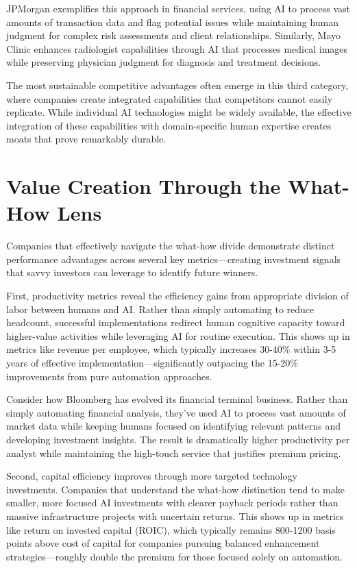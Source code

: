 \documentclass[
  Letterpaper,
]{scrbook}
\begin{document}
JPMorgan exemplifies this approach in financial services, using AI to
process vast amounts of transaction data and flag potential issues while
maintaining human judgment for complex risk assessments and client
relationships. Similarly, Mayo Clinic enhances radiologist capabilities
through AI that processes medical images while preserving physician
judgment for diagnosis and treatment decisions.

The most sustainable competitive advantages often emerge in this third
category, where companies create integrated capabilities that
competitors cannot easily replicate. While individual AI technologies
might be widely available, the effective integration of these
capabilities with domain-specific human expertise creates moats that
prove remarkably durable.

\section{Value Creation Through the What-How
Lens}\label{value-creation-through-the-what-how-lens}

Companies that effectively navigate the what-how divide demonstrate
distinct performance advantages across several key metrics---creating
investment signals that savvy investors can leverage to identify future
winners.

First, productivity metrics reveal the efficiency gains from appropriate
division of labor between humans and AI. Rather than simply automating
to reduce headcount, successful implementations redirect human cognitive
capacity toward higher-value activities while leveraging AI for routine
execution. This shows up in metrics like revenue per employee, which
typically increases 30-40\% within 3-5 years of effective
implementation---significantly outpacing the 15-20\% improvements from
pure automation approaches.

Consider how Bloomberg has evolved its financial terminal business.
Rather than simply automating financial analysis, they've used AI to
process vast amounts of market data while keeping humans focused on
identifying relevant patterns and developing investment insights. The
result is dramatically higher productivity per analyst while maintaining
the high-touch service that justifies premium pricing.

Second, capital efficiency improves through more targeted technology
investments. Companies that understand the what-how distinction tend to
make smaller, more focused AI investments with clearer payback periods
rather than massive infrastructure projects with uncertain returns. This
shows up in metrics like return on invested capital (ROIC), which
typically remains 800-1200 basis points above cost of capital for
companies pursuing balanced enhancement strategies---roughly double the
premium for those focused solely on automation.
\end{document}
